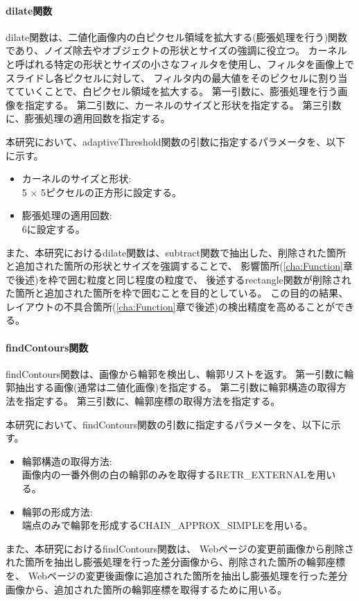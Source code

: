 \paragraph{dilate関数}
dilate関数は、二値化画像内の白ピクセル領域を拡大する(膨張処理を行う)関数であり、ノイズ除去やオブジェクトの形状とサイズの強調に役立つ。
カーネルと呼ばれる特定の形状とサイズの小さなフィルタを使用し、フィルタを画像上でスライドし各ピクセルに対して、
フィルタ内の最大値をそのピクセルに割り当てていくことで、白ピクセル領域を拡大する。
第一引数に、膨張処理を行う画像を指定する。
第二引数に、カーネルのサイズと形状を指定する。
第三引数に、膨張処理の適用回数を指定する。
\par
本研究において、adaptiveThreshold関数の引数に指定するパラメータを、以下に示す。
\begin{itemize}
      \setlength{\itemsep}{0pt}
            \setlength{\parsep}{0pt}
      \item カーネルのサイズと形状:\\
            5 $\times$ 5ピクセルの正方形に設定する。
      \item 膨張処理の適用回数:\\
            $6$に設定する。
\end{itemize}
\par
また、本研究におけるdilate関数は、subtract関数で抽出した、削除された箇所と追加された箇所の形状とサイズを強調することで、
影響箇所(\ref{cha:Function}章で後述)を枠で囲む粒度と同じ程度の粒度で、
後述するrectangle関数が削除された箇所と追加された箇所を枠で囲むことを目的としている。
この目的の結果、レイアウトの不具合箇所(\ref{cha:Function}章で後述)の検出精度を高めることができる。
\paragraph{findContours関数}
findContours関数は、画像から輪郭を検出し、輪郭リストを返す。
第一引数に輪郭抽出する画像(通常は二値化画像)を指定する。
第二引数に輪郭構造の取得方法を指定する。
第三引数に、輪郭座標の取得方法を指定する。
\par
本研究において、findContours関数の引数に指定するパラメータを、以下に示す。
\begin{itemize}
      \setlength{\itemsep}{0pt}
            \setlength{\parsep}{0pt}
      \item 輪郭構造の取得方法:\\
            画像内の一番外側の白の輪郭のみを取得するRETR\_EXTERNALを用いる。
      \item 輪郭の形成方法:\\
            端点のみで輪郭を形成するCHAIN\_APPROX\_SIMPLEを用いる。
\end{itemize}
\par
また、本研究におけるfindContours関数は、
Webページの変更前画像から削除された箇所を抽出し膨張処理を行った差分画像から、削除された箇所の輪郭座標を、
Webページの変更後画像に追加された箇所を抽出し膨張処理を行った差分画像から、追加された箇所の輪郭座標を取得するために用いる。
